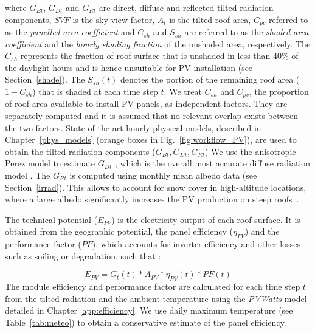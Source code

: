 where $G_{Bt}$, $G_{Dt}$ and $G_{Rt}$ are direct, diffuse and reflected tilted radiation components, $\mathit{SVF}$ is the sky view factor, $A_{t}$ is the tilted roof area, $C_{\mathit{pv}}$ referred to as the \textit{panelled area coefficient} and $C_{sh}$ and $S_{sh}$ are referred to as the \textit{shaded area coefficient} and the \textit{hourly shading fraction} of the unshaded area, respectively.
%
The $C_{sh}$ represents the fraction of roof surface that is unshaded in less than 40\% of the daylight hours and is hence unsuitable for PV installation (see Section~\ref{shade}). The $S_{sh}(t)$ denotes the portion of the remaining roof area ($1 - C_{sh}$) that is shaded at each time step $t$. 
We treat $C_{sh}$ and $C_{\mathit{pv}}$, the proportion of roof area available to install PV panels, as independent factors. They are separately computed and it is assumed that no relevant overlap exists between the two factors. 
%
State of the art hourly physical models, described in Chapter~\ref{phys_models} (orange boxes in Fig.~\ref{fig:workflow_PV}), are used to obtain the tilted radiation components ($G_{Bt}, G_{Dt}, G_{Rt}$) 
We use the anisotropic Perez model \cite{perez_modeling_1990} to estimate $G_{Dt}$ , which is the overall most accurate diffuse radiation model \cite{noorian_evaluation_2008, loutzenhiser_empirical_2007}. 
The $G_{Rt}$ is computed using monthly mean albedo data (see Section~\ref{irrad}). This allows to account for snow cover in high-altitude locations, where a large albedo significantly increases the PV production on steep roofs~\cite{kahl_bright_2019}.

The technical potential ($E_{PV}$) is the electricity output of each roof surface. It is obtained from the geographic potential, the panel efficiency ($\eta_{PV}$) and the performance factor ($\mathit{PF}$), which accounts for inverter efficiency and other losses such as soiling or degradation, such that \cite{assouline_large-scale_2018}:

\begin{equation}
\label{eq:pv}
E_{PV} = G_t(t) * A_{PV} * \eta_{PV}(t) * \mathit{PF}(t)
\end{equation}
The module efficiency and performance factor are calculated for each time step $t$ from the tilted radiation and the ambient temperature using the \textit{PVWatts} model~\cite{dobos_pvwatts_2014} detailed in Chapter \ref{app:efficiency}. We use daily maximum temperature (see Table~\ref{tab:meteo}) to obtain a conservative estimate of the panel efficiency. 

